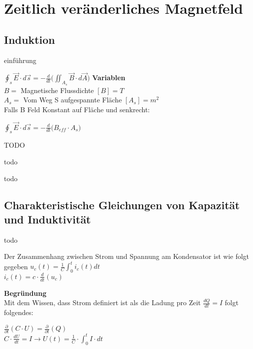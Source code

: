 %
%
%
%
%
\newpage
\section{Zeitlich veränderliches Magnetfeld}
\subsection{Induktion}

einführung

\begingl
\formulaBegin
  $\displaystyle \oint_s \vec{E}\cdot d\vec{s} = -\frac{d}{dt} \big ( \iint_{A_s} \vec{B} \cdot d\vec{A} \big )$
\formulaEnd
\textbf{Variablen} \\
$B = $ Magnetische Flussdichte $[B] = T$\\
$A_s = $ Vom Weg S aufgespannte Fläche $[A_s] = m^2$ \\

Falls B Feld Konstant auf Fläche und senkrecht:

\formulaBegin
  $\displaystyle  \oint_s \vec{E}\cdot d\vec{s} = -\frac{d}{dt} \big ( B_{eff} \cdot A_s \big ) $
\formulaEnd
\iend

\beginip
\iend

\beginbsp
TODO
\iend

\beginip
todo
\iend


\beginip
todo
\iend


\subsection{Charakteristische Gleichungen von Kapazität und Induktivität}
\begingl
todo
\iend

\begingl
Der Zusammenhang zwischen Strom und Spannung am Kondensator ist wie folgt gegeben
\formulaBegin
$\displaystyle u_c(t) = \frac{1}{C} \int_0^t i_c(t) dt$ \\

$\displaystyle i_c(t) = c \cdot \frac{d}{d t} (u_c)$ \\
\formulaEnd
\iend


\textbf{Begründung} \\
Mit dem Wissen, dass Strom definiert ist als die Ladung pro Zeit $ \displaystyle \frac{dQ}{dt} = I$ folgt folgendes: \\
\begin{center}
	$\displaystyle \frac{\partial}{\partial t} (C \cdot U) = \frac{\partial}{\partial t} (Q) $ \\
	$ \displaystyle C  \cdot \frac{dU}{dt} = I \rightarrow U(t) = \frac{1}{C} \cdot \int_0^t I \cdot dt$
\end{center}

